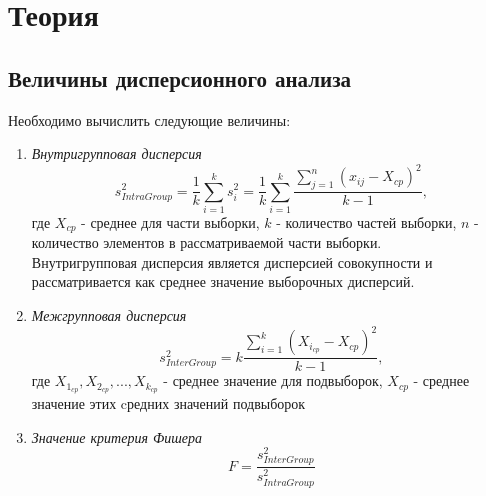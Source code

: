 \documentclass[12pt,a4paper]{article}
\begin{document}
\section{Теория}
\subsection{Величины дисперсионного анализа}
Необходимо вычислить следующие величины:
\begin{enumerate}
    \item \textit{Внутригрупповая дисперсия}
        \begin{equation}
            s_{IntraGroup}^2=\frac{1}{k}\sum_{i=1}^ks_i^2=\frac{1}{k}\sum_{i=1}^k\frac{\sum_{j=1}^n(x_{ij}-X_{cp})^2}{k-1},
        \end{equation}
        где $X_{cp}$ - среднее для части выборки, $k$ - количество частей выборки, $n$ - количество элементов в рассматриваемой части выборки.\\Внутригрупповая дисперсия является дисперсией совокупности и рассматривается как среднее значение выборочных дисперсий.
    \item \textit{Межгрупповая дисперсия}
        \begin{equation}
            s_{InterGroup}^2=k\frac{\sum_{i=1}^k(X_{i_{cp}}-X_{cp})^2}{k-1},
        \end{equation}
        где $X_{1_{cp}},X_{2_{cp}},...,X_{k_{cp}}$ - среднее значение для подвыборок, $X_{cp}$ - среднее значение этих cредних значений подвыборок
    \item \textit{Значение критерия Фишера}
        \begin{equation}
            F=\frac{s_{InterGroup}^2}{s_{IntraGroup}^2}
        \end{equation}
\end{enumerate}
\end{document}
